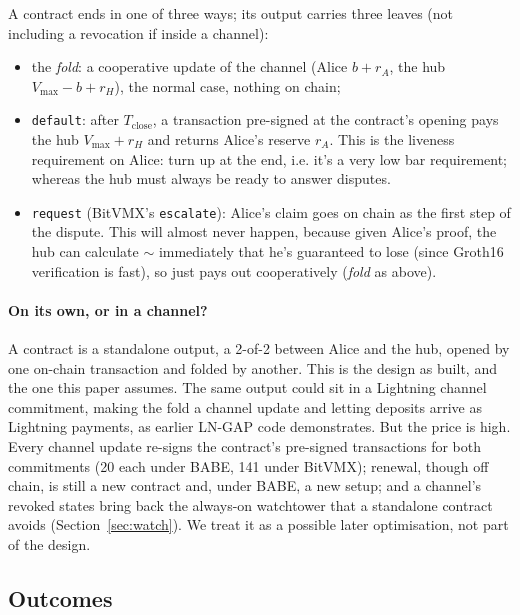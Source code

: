 \documentclass[11pt]{article}
\newcommand{\vmax}{V_{\max}}
\newcommand{\Tc}{T_{\mathrm{close}}}
\newcommand{\tx}[1]{\texttt{#1}}
\begin{document}
A contract ends in one of three ways; its output carries three leaves (not including a revocation if inside a channel):
\begin{itemize}[leftmargin=1.5em]
\item the \emph{fold}: a cooperative update of the channel (Alice
  $b + r_A$, the hub $\vmax - b + r_H$), the normal case, nothing on
  chain;
\item \tx{default}: after $\Tc$, a transaction pre-signed at the
  contract's opening pays the hub $\vmax + r_H$ and returns Alice's
  reserve $r_A$. This is the liveness requirement on Alice: turn up at the end, i.e. it's a very low bar requirement; whereas the hub must always be ready to answer disputes.
\item \tx{request} (BitVMX's \tx{escalate}): Alice's claim goes on chain
  as the first step of the dispute. This will almost never happen, because given Alice's proof, the hub can calculate $\sim$ immediately that he's guaranteed to lose (since Groth16 verification is fast), so just pays out cooperatively (\emph{fold} as above).
\end{itemize}

\paragraph{On its own, or in a channel?} A contract is a standalone
output, a 2-of-2 between Alice and the hub, opened by one on-chain
transaction and folded by another. This is the design as built, and the
one this paper assumes. The same output could sit in a Lightning channel
commitment, making the fold a channel update and letting deposits arrive
as Lightning payments, as earlier LN-GAP code demonstrates. But the
price is high. Every channel update re-signs the contract's pre-signed
transactions for both commitments (20 each under BABE, 141 under
BitVMX); renewal,
though off chain, is still a new contract and, under BABE, a new setup;
and a channel's revoked states bring back the always-on watchtower that a
standalone contract avoids (Section~\ref{sec:watch}). We treat it as a
possible later optimisation, not part of the design.

\subsection{Outcomes}
\label{sec:outcomes}
\end{document}
